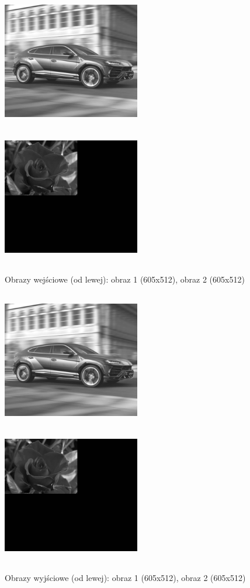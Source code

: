 \documentclass[magisterska,openany]{pracadypl}
\begin{document}
\newpage
\begin{figure}[h]
\centering
\includegraphics[width=6cm, height=6cm]{2_1/GeoG3.jpg}
\includegraphics[width=6cm, height=6cm]{2_1/GeoG4.jpg}
\caption{Obrazy wejściowe (od lewej): obraz 1 (605x512), obraz 2 (605x512) }
\end{figure}
\begin{figure}[h]
\centering
\includegraphics[width=6cm, height=6cm]{2_2/ResolG3.jpg}
\includegraphics[width=6cm, height=6cm]{2_2/ResolG4.jpg}
\caption{Obrazy wyjściowe (od lewej): obraz 1 (605x512), obraz 2 (605x512) }
\end{figure}
\end{document}
